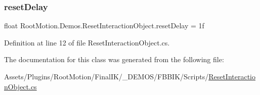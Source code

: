 \subsubsection{\texorpdfstring{reset\+Delay}{resetDelay}}
{\footnotesize\ttfamily float Root\+Motion.\+Demos.\+Reset\+Interaction\+Object.\+reset\+Delay = 1f}



Definition at line 12 of file Reset\+Interaction\+Object.\+cs.



The documentation for this class was generated from the following file\+:\begin{DoxyCompactItemize}
\item 
Assets/\+Plugins/\+Root\+Motion/\+Final\+I\+K/\+\_\+\+D\+E\+M\+O\+S/\+F\+B\+B\+I\+K/\+Scripts/\mbox{\hyperlink{_reset_interaction_object_8cs}{Reset\+Interaction\+Object.\+cs}}\end{DoxyCompactItemize}
